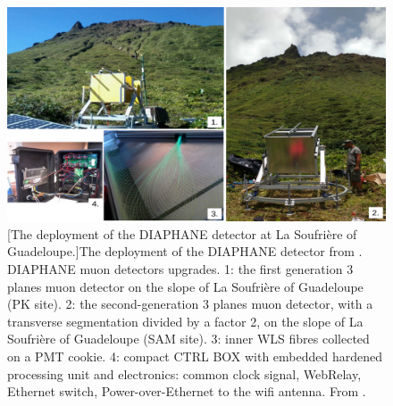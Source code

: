 
\begin{figure}[!h]
 \centering
 \includegraphics[width=1.0\linewidth]{Chapter5/Figs/Raster/DIAPHANE_deployment.png}
 [The deployment of the DIAPHANE detector at La Soufrière of Guadeloupe.]{The deployment of the DIAPHANE detector from \cite{Marteau_2017}. DIAPHANE muon detectors upgrades. 1: the first generation 3 planes muon detector on the slope of La Soufrière of Guadeloupe (PK site). 2: the second-generation 3 planes muon detector, with a transverse segmentation divided by a factor 2, on the slope of La Soufrière of Guadeloupe (SAM site). 3: inner WLS fibres collected on a PMT cookie. 4: compact CTRL BOX with embedded hardened processing unit and electronics: common clock signal, WebRelay, Ethernet switch, Power-over-Ethernet to the wifi antenna. From \cite{Marteau_2017}.} 
 \label{fig:DIAPHANE_deployment}
\end{figure}

